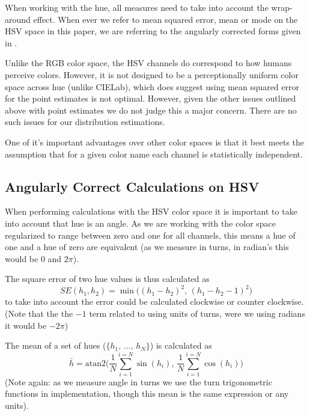 \documentclass[11pt,a4paper]{article}
\begin{document}
When working with the hue, all measures need to take into account the wrap-around effect.
When ever we refer to mean squared error, mean or mode on the HSV space in this paper, we are referring to the angularly corrected forms given in .


Unlike the RGB color space, the HSV channels do correspond to how humans perceive colors.
However, it is not designed to be a perceptionally uniform color space across hue (unlike CIELab), which does suggest using mean squared error for the point estimates is not optimal.
However, given the other issues outlined above with point estimates we do not judge this a major concern.
There are no such issues for our distribution estimations.

One of it's important advantages over other color spaces is that it best meets the assumption that for a given color name each channel is statistically independent.

\subsection{Angularly Correct Calculations on HSV}\label{sec:angularly-correct}
When performing calculations with the HSV color space it is important to take into account that hue is an angle.
As we are working with the color space regularized to range between zero and one for all channels,
this means a hue of one and a hue of zero are equivalent (as we measure in turns, in radian's this would be $0$ and $2\pi$).

The square error of two hue values is thus calculated as
\begin{equation}
SE(h_1, h_2) = \min \big( \left(h_1 - h_2 \right)^2, \, \left(h_1 - h_2 -1 \right)^2  \big)
\end{equation}
to take into account the error could be calculated clockwise or counter clockwise.
(Note that the the $-1$ term related to using units of turns, were we using radians it would be $-2\pi$)


The mean of a set of hues ($\lbrace h_1,\,\ldots,\,h_N \rbrace$) is calculated as 
\begin{equation}
\bar h = \mathrm{atan2} \Bigg(%
	\frac{1}{N} \sum_{i=1}^{i=N} \sin (h_i), \,  %
	\frac{1}{N} \sum_{i=1}^{i=N} \cos (h_i)%
\Bigg)%
\end{equation}
(Note again: as we measure angle in turns we use the turn trigonometric functions in implementation, though this mean is the same expression or any units).
\end{document}
